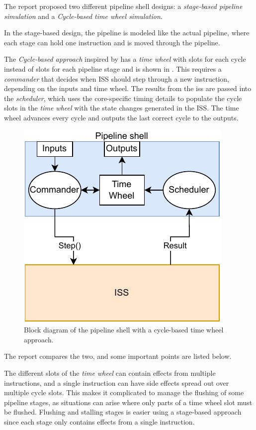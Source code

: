 The report proposed two different pipeline shell designs: a \textit{stage-based pipeline simulation} and a \textit{Cycle-based time wheel simulation}. 

In the stage-based design, the pipeline is modeled like the actual pipeline, where each stage can hold one instruction and is moved through the pipeline.

The \textit{Cycle-based approach} inspired by \textcite{chiangEfficientTwolayeredCycleaccurate2009} has a \textit{time wheel} with slots for each cycle instead of slots for each pipeline stage and is shown in . This requires a \textit{commander} that decides when ISS should step through a new instruction, depending on the inputs and time wheel. The results from the \acrshort{iss} are passed into the \textit{scheduler}, which uses the core-specific timing details to populate the cycle slots in the \textit{time wheel} with the state changes generated in the ISS. The time wheel advances every cycle and outputs the last correct cycle to the outputs.

\begin{figure}[htb]
    \centering
    \includegraphics[width=0.5\linewidth]{prosjektoppgave/time-wheel.pdf}
    \caption{Block diagram of the pipeline shell with a cycle-based time wheel approach.}
    \label{fig:time wheel block}
\end{figure}

The report compares the two, and some important points are listed below.

The different slots of the \textit{time wheel} can contain effects from multiple instructions, and a single instruction can have side effects spread out over multiple cycle slots. This makes it complicated to manage the flushing of some pipeline stages, as situations can arise where only parts of a time wheel slot must be flushed. Flushing and stalling stages is easier using a stage-based approach since each stage only contains effects from a single instruction.

